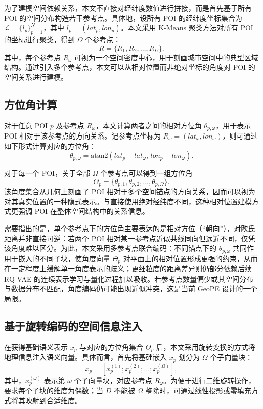 为了建模空间依赖关系，本文不直接对经纬度数值进行拼接，而是首先基于所有 POI 的空间分布构造若干参考点。具体地，设所有 POI 的经纬度坐标集合为 $\mathcal{L}=\{l_p\}_{p=1}^{N}$，其中 $l_p=(lat_p, lon_p)$。本文采用 K-Means 聚类方法对所有 POI 的坐标进行聚类，得到 $\Omega$ 个参考点：
\begin{equation}
R = \{R_1, R_2, \dots, R_{\Omega}\}.
\end{equation}
其中，每个参考点 $R_{\omega}$ 可视为一个空间密度中心，用于刻画城市空间中的典型区域结构。通过引入多个参考点，本文可以从相对位置而非绝对坐标的角度对 POI 的空间关系进行建模。

\subsection{方位角计算}

对于任意 POI $p$ 及参考点 $R_{\omega}$，本文计算两者之间的相对方位角 $\theta_{p,\omega}$，用于表示 POI 相对于该参考点的方向关系。记参考点坐标为 $R_{\omega}=(lat_{\omega}, lon_{\omega})$，则可通过如下形式计算对应的方位角：
\begin{equation}
\theta_{p,\omega} = \mathrm{atan2}(lat_p-lat_{\omega},\, lon_p-lon_{\omega}).
\end{equation}

对于每一个 POI，关于全部 $\Omega$ 个参考点可以得到一组方位角
\begin{equation}
\Theta_p = \{\theta_{p,1}, \theta_{p,2}, \dots, \theta_{p,\Omega}\}.
\end{equation}
该角度集合从几何上刻画了 POI 相对于多个空间锚点的方向关系，因而可以视为对其真实位置的一种隐式表示。与直接使用绝对经纬度不同，这种相对位置建模方式更强调 POI 在整体空间结构中的关系信息。

需要指出的是，单个参考点下的方位角主要表达的是相对方位（“朝向”），对欧氏距离并非直接可逆：若两个 POI 相对某一参考点近似共线同向但远近不同，仅凭该角度难以区分。为此，本文采用多参考点联合编码：不同锚点下的 $\theta_{p,\omega}$ 共同作用于嵌入的不同子块，使角度向量 $\Theta_p$ 对平面上的相对位置形成更强的约束，从而在一定程度上缓解单一角度表示的歧义；更细粒度的距离差异则仍部分依赖后续 RQ-VAE 的连续表示学习与量化过程加以吸收。若参考点数量偏少或其空间分布与数据分布不匹配，角度编码仍可能出现近似冲突，这是当前 GeoPE 设计的一个局限。

\subsection{基于旋转编码的空间信息注入}

在获得基础语义表示 $x_p$ 与对应的方位角集合 $\Theta_p$ 后，本文采用旋转变换的方式将地理信息注入语义向量。具体而言，首先将基础嵌入 $x_p$ 划分为 $\Omega$ 个子向量块：
\begin{equation}
x_p = [x_p^{(1)}; x_p^{(2)}; \dots; x_p^{(\Omega)}],
\end{equation}
其中，$x_p^{(\omega)}$ 表示第 $\omega$ 个子向量块，对应参考点 $R_{\omega}$。为便于进行二维旋转操作，要求每个子块的维度为偶数；当 $D$ 不能被 $\Omega$ 整除时，可通过线性投影或零填充方式将其映射到合适维度。

